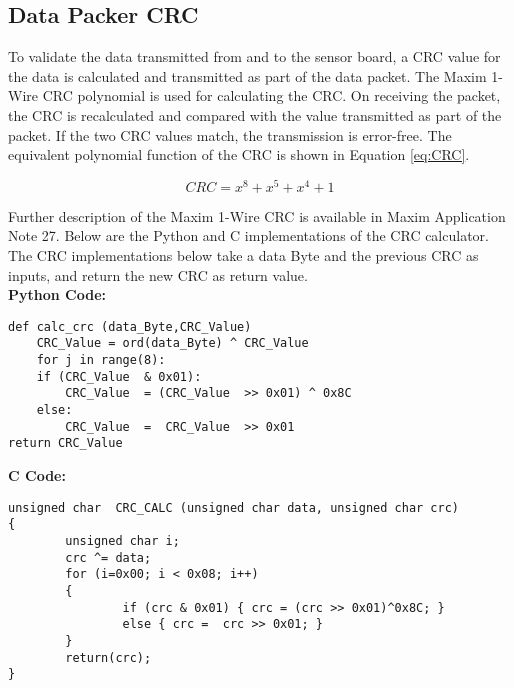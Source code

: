 \subsection{Data Packer CRC} \label{ssec:crc-calc}

To validate the data transmitted from and to the sensor board, a CRC value for the data is
calculated and transmitted as part of the data packet. The Maxim 1-Wire
CRC polynomial is used for calculating the CRC.  On receiving the packet, the CRC is recalculated and compared with the value transmitted as part of
the packet. If the two CRC values match, the transmission is error-free.
The equivalent polynomial function of the CRC is shown in Equation \ref{eq:CRC}.

\begin{equation}
\label{eq:CRC}
CRC = x^8 + x^5 + x^4 + 1
\end{equation}

Further description of the Maxim 1-Wire CRC is available in Maxim Application Note 27. Below are
the Python and C implementations of the CRC calculator. The CRC implementations below take a
data Byte and the previous CRC as inputs, and return the new CRC as return value.
\\

\textbf{Python Code:}
\begin{mdframed}
\begin{lstlisting}
def calc_crc (data_Byte,CRC_Value)
    CRC_Value = ord(data_Byte) ^ CRC_Value
    for j in range(8):
    if (CRC_Value  & 0x01):
        CRC_Value  = (CRC_Value  >> 0x01) ^ 0x8C
    else:
        CRC_Value  =  CRC_Value  >> 0x01
return CRC_Value
\end{lstlisting}
\end{mdframed}

\vskip 0.1in
\textbf{C Code:}
\begin{mdframed}
\begin{lstlisting}
unsigned char  CRC_CALC (unsigned char data, unsigned char crc) 
{ 
        unsigned char i;
        crc ^= data;
        for (i=0x00; i < 0x08; i++)
        {
                if (crc & 0x01) { crc = (crc >> 0x01)^0x8C; }
                else { crc =  crc >> 0x01; }
        }
        return(crc);
}
\end{lstlisting}
\end{mdframed}